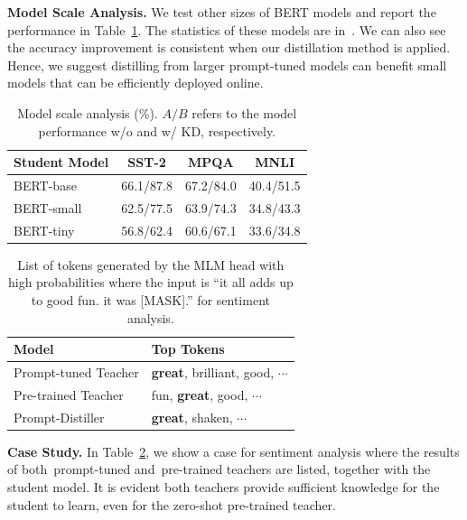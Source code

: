 \documentclass{article}
\begin{document}
\noindent\textbf{Model Scale Analysis.}
We test other sizes of BERT models and report the performance in Table~\ref{tab:model}. The statistics of these models are in~\cite{DBLP:journals/corr/abs-1908-08962}. We can also see the accuracy improvement is consistent when our distillation method is applied.
Hence, we suggest distilling from larger prompt-tuned models can benefit small models that can be efficiently deployed online.

\begin{table}
	\centering
	\begin{small}
		\begin{tabular}{l|ccc}
			\hline
			\bf Student Model & \bf SST-2 & \bf MPQA  & \bf MNLI  \\
			\hline
			BERT-base         & 66.1/87.8 & 67.2/84.0 & 40.4/51.5 \\
			BERT-small        & 62.5/77.5 & 63.9/74.3 & 34.8/43.3 \\
			BERT-tiny         & 56.8/62.4 & 60.6/67.1 & 33.6/34.8 \\
			\hline
		\end{tabular}
	\end{small}
	\caption{\label{tab:model} Model scale analysis (\%). $A/B$ refers to the model performance w/o and w/ KD, respectively.}
	\bigskip
\end{table}

\begin{table}[h!]
	\centering
	\begin{small}
		\begin{tabular}{l|l}
			\hline
			\bf Model            & \bf Top Tokens                            \\
			\hline
			Prompt-tuned Teacher & \textbf{great}, brilliant, good, $\cdots$ \\
			Pre-trained Teacher  & fun, \textbf{great}, good, $\cdots$       \\
			\hline
			{Prompt-Distiller}   & \textbf{great}, shaken, $\cdots$          \\
			\hline
		\end{tabular}
	\end{small}
	\caption{\label{tab:case} List of tokens generated by the MLM head with high probabilities where the input is ``it all adds up to good fun. it was [MASK].'' for sentiment analysis.}
\end{table}

\noindent\textbf{Case Study.}
In Table~\ref{tab:case}, we show a case for sentiment analysis where the results of both~{prompt-tuned} and~{pre-trained} teachers are listed, together with the student model.
It is evident both teachers provide sufficient knowledge for the student to learn, even for the zero-shot pre-trained teacher.
\end{document}
